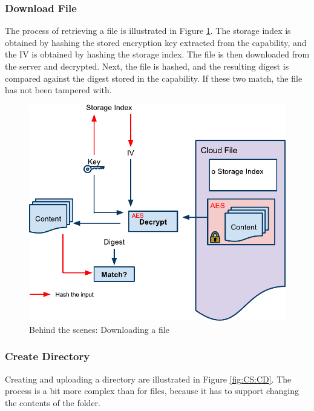 \documentclass[pdftex,english,10pt,b5paper,twoside]{book}
\begin{document}
\subsubsection{Download File}
\label{sec:CS:OF}

The process of retrieving a file is illustrated in Figure \ref{fig:CS:OF}. The
storage index is obtained by hashing the stored encryption key extracted from
the capability, and the \ac{IV} is obtained by hashing the storage index. The
file is then downloaded from the server and decrypted. Next, the file is
hashed, and the resulting digest is compared against the digest stored in the
capability. If these two match, the file has not been tampered with.

\begin{figure}[h!]
    \centering
    \includegraphics[width=\columnwidth]{CryptoOpenFile.pdf}
    \caption{Behind the scenes: Downloading a file}
    \label{fig:CS:OF}
\end{figure}

\subsubsection{Create Directory}

Creating and uploading a directory are illustrated in Figure \ref{fig:CS:CD}.
The process is a bit more complex than for files, because it has to support
changing the contents of the folder.
\end{document}
